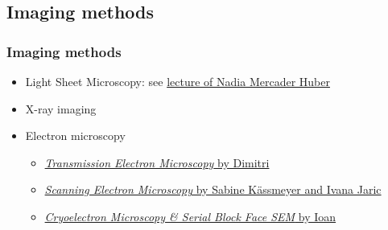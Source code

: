 \subsection{Imaging methods}
\begin{frame}
	\frametitle{Imaging methods}
	\begin{itemize}
		\item Light Sheet Microscopy: see \href{https://ilias.unibe.ch/goto_ilias3_unibe_sess_2774501.html}{lecture of Nadia Mercader Huber }
		\item X-ray imaging
		\item Electron microscopy
		\begin{itemize}
			\item \href{https://ilias.unibe.ch/goto_ilias3_unibe_sess_2774501.html}{\emph{Transmission Electron Microscopy} by Dimitri}
			\item \href{https://ilias.unibe.ch/goto_ilias3_unibe_sess_2177954.html}{\emph{Scanning Electron Microscopy} by Sabine Kässmeyer and Ivana Jaric}
			\item \href{https://ilias.unibe.ch/goto_ilias3_unibe_sess_2774507.html}{\emph{Cryoelectron Microscopy \& Serial Block Face SEM} by Ioan}
		\end{itemize}
	\end{itemize}
\end{frame}

